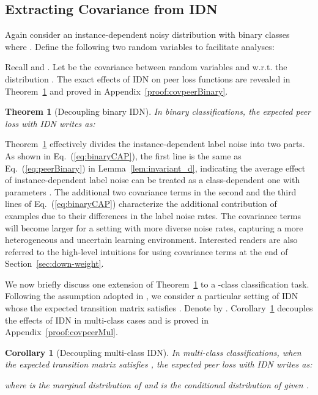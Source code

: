 \documentclass[final]{cvpr}
\newtheorem{theorem}{Theorem}
\newtheorem{corollary}{Corollary}
\newcommand{\rev}[1]{{\color{blue}#1}}
\newcommand{\rev}[1]{#1}
\begin{document}
\subsection{Extracting Covariance from IDN}\label{sec:extension}




Again consider an instance-dependent noisy distribution  with binary classes where .
Define the following two random variables \rev{to facilitate analyses}:

Recall  and .
Let  be the covariance between random variables  and  w.r.t. the distribution .
The exact effects of IDN on peer loss functions are revealed in Theorem~\ref{thm:covpeerBinary} and proved in Appendix~\ref{proof:covpeerBinary}.

\begin{theorem}[Decoupling binary IDN]
\label{thm:covpeerBinary}
In binary classifications, the expected peer loss with IDN writes as:

\end{theorem}


Theorem~\ref{thm:covpeerBinary} effectively divides the instance-dependent label noise into two parts.
As shown in Eq.~(\ref{eq:binaryCAP}), the first line is the same as Eq.~(\ref{eq:peerBinary}) in Lemma~\ref{lem:invariant_d}, indicating the average effect of instance-dependent label noise can be treated as a class-dependent one with parameters . The additional two covariance terms in the second and the third lines of Eq.~(\ref{eq:binaryCAP}) characterize the additional contribution of examples due to their differences in the label noise rates. The covariance terms will become larger for a setting with more diverse noise rates, capturing a more heterogeneous and uncertain learning environment. Interested readers are also referred to the high-level intuitions for using covariance terms at the end of Section~\ref{sec:down-weight}. 


\rev{We now briefly discuss one extension of Theorem~\ref{thm:covpeerBinary} to a -class classification task.
Following the assumption adopted in \cite{liu2019peer}, we consider a particular setting of IDN whose the expected transition matrix satisfies .}
Denote by .
\rev{Corollary~\ref{cor:covpeerMul} decouples the effects of IDN in multi-class cases and is proved in Appendix~\ref{proof:covpeerMul}.}
\begin{corollary}[Decoupling multi-class IDN]
\label{cor:covpeerMul}
In multi-class classifications, when the expected transition matrix satisfies ,  the expected peer loss with IDN writes as:

where  is the marginal distribution of  and  is the conditional distribution of  given .  \end{corollary}
\end{document}

